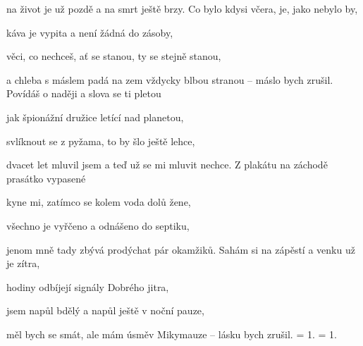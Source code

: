 na život je už pozdě a na smrt ještě brzy.
\ks
\zr
Co bylo kdysi včera, je, jako nebylo by,

káva je vypita a není žádná do zásoby,

věci, co nechceš, ať se stanou, ty se stejně stanou,

a chleba s máslem padá na zem vždycky blbou stranou --
máslo bych zrušil.
\kr
\zs
Povídáš o naději a slova se ti pletou

jak špionážní družice letící nad planetou,

svlíknout se z pyžama, to by šlo ještě lehce,

dvacet let mluvil jsem a teď už se mi mluvit nechce.
\ks
\zs
Z plakátu na záchodě prasátko vypasené

kyne mi, zatímco se kolem voda dolů žene,

všechno je vyřčeno a odnášeno do septiku,

jenom mně tady zbývá prodýchat pár okamžiků.
\ks
\zr
Sahám si na zápěstí a venku už je zítra,

hodiny odbíjejí signály Dobrého jitra,

jsem napůl bdělý a napůl ještě v noční pauze,

měl bych se smát, ale mám úsměv Mikymauze --
lásku bych zrušil.
\kr
\zs
= 1.
\ks
\zs
= 1.
\ks
\kp
